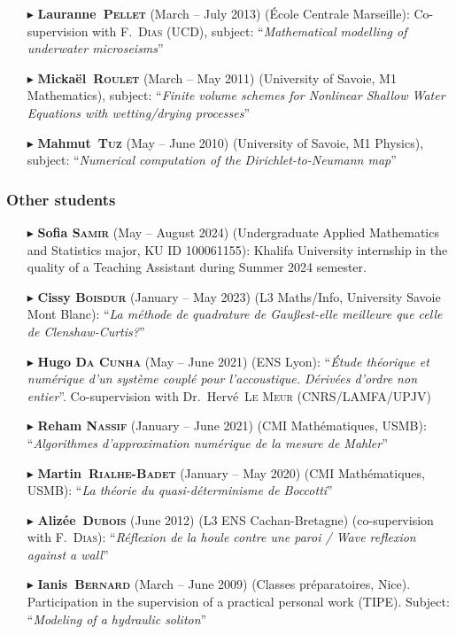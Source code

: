 \begin{itemize}
            \item[$\blacktriangleright$] \textbf{Lauranne~\textsc{Pellet}} (March -- July 2013) (\'Ecole Centrale Marseille): Co-supervision with F.~\textsc{Dias} (UCD), subject: ``\textit{Mathematical modelling of underwater microseisms}''
            \item[$\blacktriangleright$] \textbf{Micka\"el~\textsc{Roulet}} (March -- May 2011) (University of Savoie, M1 Mathematics), subject: ``\textit{Finite volume schemes for Nonlinear Shallow Water Equations with wetting/drying processes}''
            \item[$\blacktriangleright$] \textbf{Mahmut~\textsc{Tuz}} (May -- June 2010) (University of Savoie, M1 Physics), subject: ``\textit{Numerical computation of the Dirichlet-to-Neumann map}''
        \end{itemize}

        \separator
        \subsubsection{Other students}
        \begin{itemize}
            \item[$\blacktriangleright$] \textbf{Sofia \textsc{Samir}} (May -- August 2024) (Undergraduate Applied Mathematics and Statistics major, KU ID 100061155): Khalifa University internship in the quality of a Teaching Assistant during Summer 2024 semester.
            \item[$\blacktriangleright$] \textbf{Cissy \textsc{Boisdur}} (January -- May 2023) (L3 Maths/Info, University Savoie Mont Blanc): ``\textit{La m\'ethode de quadrature de Gau\ss est-elle meilleure que celle de Clenshaw-Curtis?}''
            \item[$\blacktriangleright$] \textbf{Hugo \textsc{Da Cunha}} (May -- June 2021) (ENS Lyon): ``\textit{\'Etude th\'eorique et num\'erique d'un syst\`eme coupl\'e pour l'accoustique. D\'eriv\'ees d'ordre non entier}''. Co-supervision with Dr.~Herv\'e~\textsc{Le Meur} (CNRS/LAMFA/UPJV)
            \item[$\blacktriangleright$] \textbf{Reham \textsc{Nassif}} (January -- June 2021) (CMI Math\'ematiques, USMB): ``\textit{Algorithmes d'approximation num\'erique de la mesure de Mahler}''
            \item[$\blacktriangleright$] \textbf{Martin~\textsc{Rialhe-Badet}} (January -- May 2020) (CMI Math\'ematiques, USMB): ``\textit{La th\'eorie du quasi-d\'eterminisme de Boccotti}''
            \item[$\blacktriangleright$] \textbf{Aliz\'ee~\textsc{Dubois}} (June 2012) (L3 ENS Cachan-Bretagne) (co-supervision with F.~\textsc{Dias}): ``\textit{R\'eflexion de la houle contre une paroi / Wave reflexion against a wall}''
            \item[$\blacktriangleright$] \textbf{Ianis~\textsc{Bernard}} (March -- June 2009) (Classes pr\'eparatoires, Nice). Participation in the supervision of a practical personal work (TIPE). Subject: ``\textit{Modeling of a hydraulic soliton}''
        \end{itemize}

